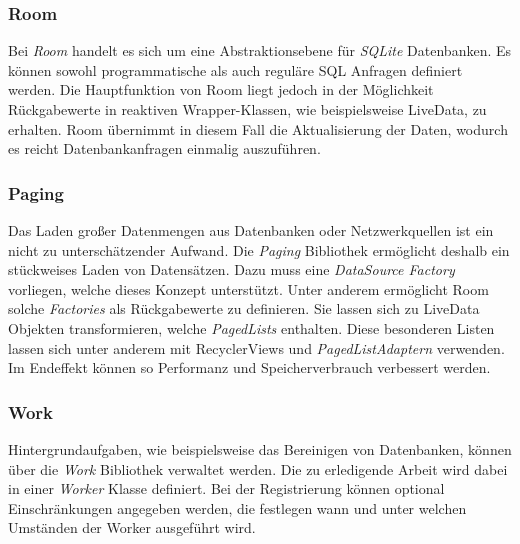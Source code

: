 \subsubsection{Room}
\label{subsubsec:app:jetpack:room}
Bei \textit{Room} handelt es sich um eine Abstraktionsebene für \textit{SQLite} Datenbanken.
Es können sowohl programmatische als auch reguläre SQL Anfragen definiert werden.
Die Hauptfunktion von Room liegt jedoch in der Möglichkeit Rückgabewerte in reaktiven Wrapper-Klassen, wie beispielsweise LiveData, zu erhalten.
Room übernimmt in diesem Fall die Aktualisierung der Daten, wodurch es reicht Datenbankanfragen einmalig auszuführen.

\subsubsection{Paging}
\label{subsubsec:app:jetpack:paging}
Das Laden großer Datenmengen aus Datenbanken oder Netzwerkquellen ist ein nicht zu unterschätzender Aufwand.
Die \textit{Paging} Bibliothek ermöglicht deshalb ein stückweises Laden von Datensätzen.
Dazu muss eine \textit{DataSource Factory} vorliegen, welche dieses Konzept unterstützt.
Unter anderem ermöglicht Room solche \textit{Factories} als Rückgabewerte zu definieren.
Sie lassen sich zu LiveData Objekten transformieren, welche \textit{PagedLists} enthalten.
Diese besonderen Listen lassen sich unter anderem mit RecyclerViews und \textit{PagedListAdaptern} verwenden.
Im Endeffekt können so Performanz und Speicherverbrauch verbessert werden.

\subsubsection{Work}
\label{subsubsec:app:jetpack:work}
Hintergrundaufgaben, wie beispielsweise das Bereinigen von Datenbanken, können über die \textit{Work} Bibliothek verwaltet werden.
Die zu erledigende Arbeit wird dabei in einer \textit{Worker} Klasse definiert.
Bei der Registrierung können optional Einschränkungen angegeben werden, die festlegen wann und unter welchen Umständen der Worker ausgeführt wird.

